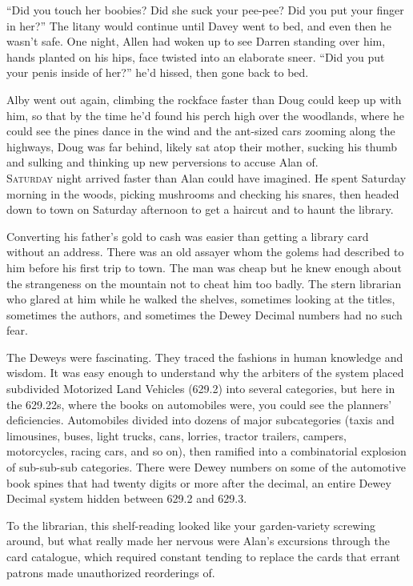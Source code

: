 ``Did you touch her boobies?  Did she suck your pee-pee?  Did you put
your finger in her?'' The litany would continue until Davey went to
bed, and even then he wasn't safe.  One night, Allen had woken up to
see Darren standing over him, hands planted on his hips, face twisted
into an elaborate sneer.  ``Did you put your penis inside of her?''
he'd hissed, then gone back to bed.

Alby went out again, climbing the rockface faster than Doug could keep
up with him, so that by the time he'd found his perch high over the
woodlands, where he could see the pines dance in the wind and the
ant-sized cars zooming along the highways, Doug was far behind, likely
sat atop their mother, sucking his thumb and sulking and thinking up
new perversions to accuse Alan of.
\\
\lettrine[lines=3, lhang=.5, nindent=0pt, findent=2pt]{S}{aturday} night arrived faster than Alan could have imagined.  He spent
Saturday morning in the woods, picking mushrooms and checking his
snares, then headed down to town on Saturday afternoon to get a
haircut and to haunt the library.

Converting his father's gold to cash was easier than getting a library
card without an address.  There was an old assayer whom the golems had
described to him before his first trip to town.  The man was cheap but
he knew enough about the strangeness on the mountain not to cheat him
too badly.  The stern librarian who glared at him while he walked the
shelves, sometimes looking at the titles, sometimes the authors, and
sometimes the Dewey Decimal numbers had no such fear.

The Deweys were fascinating.  They traced the fashions in human
knowledge and wisdom.  It was easy enough to understand why the
arbiters of the system placed subdivided Motorized Land Vehicles
(629.2) into several categories, but here in the 629.22s, where the
books on automobiles were, you could see the planners' deficiencies. 
Automobiles divided into dozens of major subcategories (taxis and
limousines, buses, light trucks, cans, lorries, tractor trailers,
campers, motorcycles, racing cars, and so on), then ramified into a
combinatorial explosion of sub-sub-sub categories.  There were Dewey
numbers on some of the automotive book spines that had twenty digits
or more after the decimal, an entire Dewey Decimal system hidden
between 629.2 and 629.3.

To the librarian, this shelf-reading looked like your garden-variety
screwing around, but what really made her nervous were Alan's
excursions through the card catalogue, which required constant tending
to replace the cards that errant patrons made unauthorized reorderings
of.

